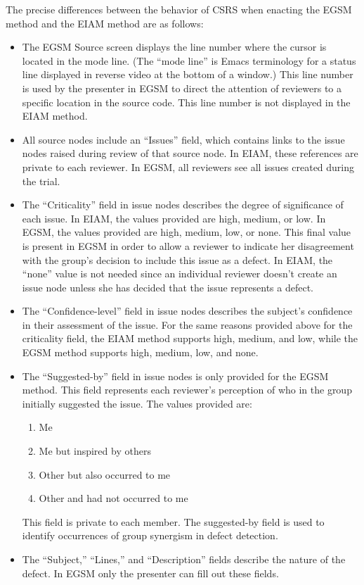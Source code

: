The precise differences between the behavior of CSRS when enacting the 
EGSM method and the EIAM method are as follows:

\begin{itemize}
\item The EGSM Source screen displays the line number where the cursor is
  located in the mode line. (The ``mode line'' is Emacs terminology for a
  status line displayed in reverse video at the bottom of a window.) This
  line number is used by the presenter in EGSM to direct the attention of
  reviewers to a specific location in the source code. This line number is
  not displayed in the EIAM method.

\item All source nodes include an ``Issues'' field, which contains links to
  the issue nodes raised during review of that source node. In EIAM,
  these references are private to each reviewer. In EGSM, all reviewers see
  all issues created during the trial.
  
\item The ``Criticality'' field in issue nodes describes the degree of
  significance of each issue. In EIAM, the values provided
  are  high, medium, or low. In EGSM, the values provided are high, medium,
  low, or none. This final value is present in EGSM in order to allow a 
  reviewer to indicate her disagreement with the group's decision to
  include this issue as a defect. In EIAM, the ``none'' value is not needed
  since an individual reviewer doesn't create an issue node unless she has
  decided that the issue represents a defect.
  
\item The ``Confidence-level'' field in issue nodes describes the subject's
  confidence in their assessment of the issue. For the same reasons
  provided above for the criticality field, the EIAM method supports high,
  medium, and low, while the EGSM method supports high, medium, low, and
  none.

  
\item The ``Suggested-by'' field in issue nodes is only provided for the
  EGSM method.
  This field represents each reviewer's perception of who 
  in the group initially suggested the issue. The values provided are:
  \begin{enumerate}
  \item Me
  \item Me but inspired by others
  \item Other but also occurred to  me
  \item Other and had not occurred to me
  \end{enumerate}
  
  This field is private to each member.  The suggested-by field is used to
  identify occurrences of group synergism in defect detection. 
  
\item The ``Subject,'' ``Lines,'' and ``Description'' fields describe the
  nature of the defect. In EGSM only the presenter can fill out these
  fields.

\end{itemize}




